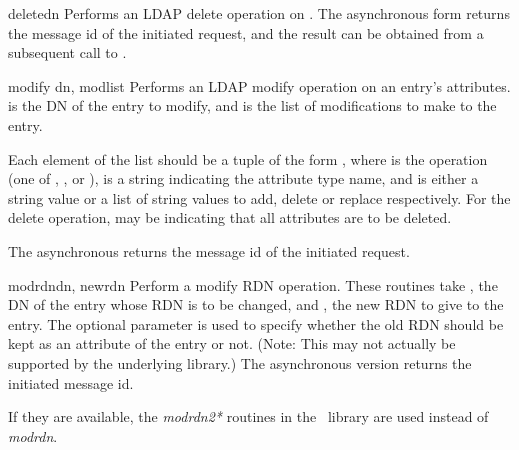 
\begin{methoddesc}[int]{delete}{dn}
Performs an LDAP delete operation on . The asynchronous form
returns the message id of the initiated request, and the result can be obtained
from a subsequent call to .
\end{methoddesc}


\begin{methoddesc}[int]{modify}{ dn, modlist }
Performs an LDAP modify operation on an entry's attributes. 
 is the DN of the entry to modify,
and  is the list of modifications to make to the entry.

Each element of the list  should be a tuple of the form 
,
where  is the operation (one of , 
, or ),
 is a string indicating the attribute type name, and 
 is either a string value or a list of string values to add, 
delete or replace respectively.  For the delete operation, 
may be  indicating that all attributes are to be deleted.

The asynchronous  returns the message id of the 
initiated request.

\end{methoddesc}


\begin{methoddesc}[int]{modrdn}{dn, newrdn }
Perform a modify RDN operation. These routines take , the DN
of the entry whose RDN is to be changed, and , the new RDN to
give to the entry. The optional parameter  is used to specify
whether the old RDN should be kept as an attribute of the entry or not.
(Note: This may not actually be supported by the underlying library.)
The asynchronous version returns the initiated message id.

If they are available, the \emph{modrdn2*} routines in the \C\ library
are used instead of \emph{modrdn}.
\end{methoddesc}

